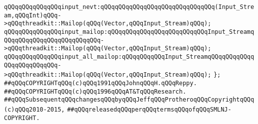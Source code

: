 \verb|qQQqqQQqqQQqqQQqinput_nevt:qQQqqQQqqQQqqQQqqQQqqQQqqQQqqQQq(Input_Stream,qQQqInt)qQQq->qQQqthreadkit::Mailop(qQQq(Vector,qQQqInput_Stream)qQQq);|\newline
\newline
\verb|qQQqqQQqqQQqqQQqinput_mailop:qQQqqQQqqQQqqQQqqQQqqQQqqQQqInput_StreamqQQqqQQqqQQqqQQqqQQqqQQqqQQq->qQQqthreadkit::Mailop(qQQq(Vector,qQQqInput_Stream)qQQq);|\newline
\verb|qQQqqQQqqQQqqQQqinput_all_mailop:qQQqqQQqqQQqInput_StreamqQQqqQQqqQQqqQQqqQQqqQQqqQQq->qQQqthreadkit::Mailop(qQQq(Vector,qQQqInput_Stream)qQQq);|\newline
\newline
\verb|};|\newline
\newline
\newline
\newline
\verb|##qQQqCOPYRIGHTqQQq(c)qQQq1991qQQqJohnqQQqH.qQQqReppy.|\newline
\verb|##qQQqCOPYRIGHTqQQq(c)qQQq1996qQQqAT&TqQQqResearch.|\newline
\verb|##qQQqSubsequentqQQqchangesqQQqbyqQQqJeffqQQqProtheroqQQqCopyrightqQQq(c)qQQq2010-2015,|\newline
\verb|##qQQqreleasedqQQqperqQQqtermsqQQqofqQQqSMLNJ-COPYRIGHT.|\newline

